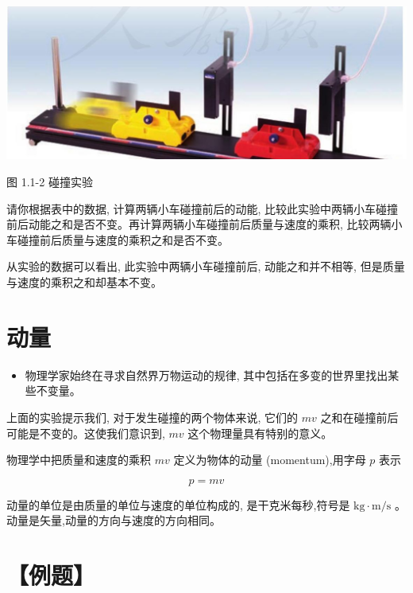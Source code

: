 \documentclass[10pt]{article}
\begin{document}
\begin{center}
\includegraphics[max width=1.0\textwidth]{images/01910e4c-ebb8-7d2c-8f2f-2375bc1d2d12_8_843249.jpg}
\end{center}

图 1.1-2 碰撞实验

请你根据表中的数据, 计算两辆小车碰撞前后的动能, 比较此实验中两辆小车碰撞前后动能之和是否不变。再计算两辆小车碰撞前后质量与速度的乘积, 比较两辆小车碰撞前后质量与速度的乘积之和是否不变。

从实验的数据可以看出, 此实验中两辆小车碰撞前后, 动能之和并不相等, 但是质量与速度的乘积之和却基本不变。

\section*{动量}

\begin{mdframed}

\begin{itemize}
\item 物理学家始终在寻求自然界万物运动的规律, 其中包括在多变的世界里找出某些不变量。
\end{itemize}

\end{mdframed}

上面的实验提示我们, 对于发生碰撞的两个物体来说, 它们的 \({mv}\) 之和在碰撞前后可能是不变的。这使我们意识到, \({mv}\) 这个物理量具有特别的意义。

物理学中把质量和速度的乘积 \({mv}\) 定义为物体的动量 (momentum),用字母 \(p\) 表示

\[
p = {mv}
\]

动量的单位是由质量的单位与速度的单位构成的, 是干克米每秒,符号是 \(\mathrm{{kg}} \cdot \mathrm{m}/\mathrm{s}\) 。动量是矢量,动量的方向与速度的方向相同。

\section*{【例题】}
\end{document}
